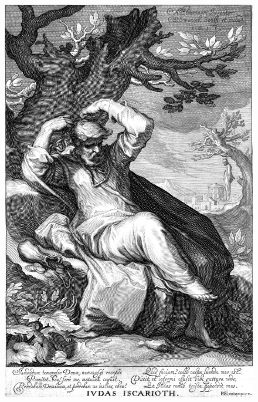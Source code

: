 {\cleartoleftpage{}
\begin{figure}[p!]
  \begingroup
  \centering
  \includegraphics[keepaspectratio,width=\textwidth]{figures/iudas-small.jpg}
  \label{fig:iudas}
\end{figure}
\clearpage{}
\thispagestyle{titleontop}
}
